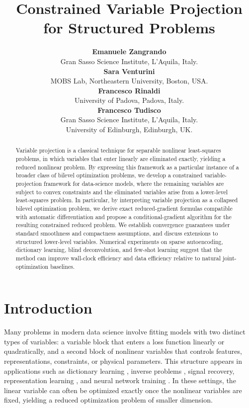 \documentclass{article}
\title{Constrained Variable Projection for Structured Problems} %
\author{%
\textbf{Emanuele Zangrando}\\
Gran Sasso Science Institute,  L'Aquila, Italy.\\ 
    \And
    \textbf{Sara Venturini}\\
    MOBS Lab, Northeastern University, Boston, USA. \\
    \AND
    \textbf{Francesco Rinaldi}\\
    University of Padova, Padova, Italy.\\
    \And 
    \textbf{Francesco Tudisco}\\
    Gran Sasso Science Institute, L'Aquila, Italy.\\
    University of Edinburgh, Edinburgh, UK.
}
\begin{document}
\maketitle

\begin{abstract}

Variable projection is a classical technique for separable nonlinear least-squares problems, in which variables that enter linearly are eliminated exactly, yielding a reduced nonlinear problem. By expressing this framework as a particular instance of a broader class of bilevel optimization problems, we develop a constrained variable-projection framework for data-science models, where the remaining variables are subject to convex constraints and the eliminated variables arise from a lower-level least-squares problem. In particular, by interpreting variable projection as a collapsed bilevel optimization problem, we derive exact reduced-gradient formulas compatible with automatic differentiation and propose a conditional-gradient algorithm for the resulting constrained reduced problem. We establish convergence guarantees under standard smoothness and compactness assumptions, and discuss extensions to structured lower-level variables. Numerical experiments on sparse autoencoding, dictionary learning, blind deconvolution, and few-shot learning suggest that the method can improve wall-clock efficiency and data efficiency relative to natural joint-optimization baselines.
\end{abstract}


\section{Introduction}\label{sec:introduction}
Many problems in modern data science involve fitting models with two distinct types of variables: a variable block that enters a loss function linearly or quadratically, and a second block of nonlinear variables that controls features, representations, constraints, or physical parameters. This structure appears in applications such as dictionary learning \cite{Rubinstein_DL}, inverse problems \cite{Chavent2009-aa}, signal recovery, representation learning \cite{snlls21}, and neural network training \cite{ruthotto_trainvarpro}. In these settings, the linear variable can often be optimized exactly once the nonlinear variables are fixed, yielding a reduced optimization problem of smaller dimension.
\end{document}
